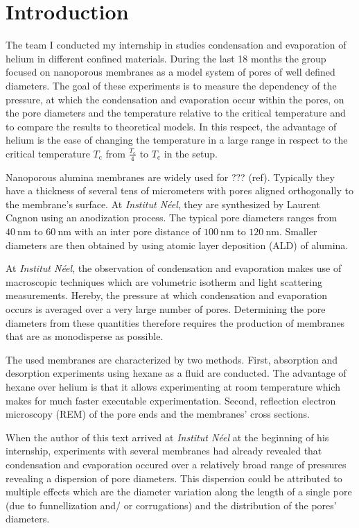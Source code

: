 \documentclass[../thesis.tex]{subfiles}
\begin{document}
  \chapter{Introduction}
  \label{ch:introduction}

    The team I conducted my internship in studies condensation and evaporation of helium in different confined materials. During the last 18 months the group focused on nanoporous membranes as a model system of pores of well defined diameters. The goal of these experiments is to measure the dependency of the pressure, at which the condensation and evaporation occur within the pores, on the pore diameters and the temperature relative to the critical temperature and to compare the results to theoretical models. In this respect, the advantage of helium is the ease of changing the temperature in a large range in respect to the critical temperature $T_\mathrm{c}$ from $\frac{T_\mathrm{c}}{4}$ to $T_\mathrm{c}$ in the setup.
    \medskip

    Nanoporous alumina membranes are widely used for ??? (ref). Typically they have a thickness of several tens of micrometers with pores aligned orthogonally to the membrane's surface. At \textit{Institut Néel}, they are synthesized by Laurent Cagnon using an anodization process. The typical pore diameters ranges from $\SI{40}{\nano\meter}$ to $\SI{60}{\nano\meter}$ with an inter pore distance of $\SI{100}{\nano\meter}$ to $\SI{120}{\nano\meter}$. Smaller diameters are then obtained by using atomic layer deposition (ALD) of alumina.
    \medskip

    At \textit{Institut Néel}, the observation of condensation and evaporation makes use of macroscopic techniques which are volumetric isotherm and light scattering measurements. Hereby, the pressure at which condensation and evaporation occurs is averaged over a very large number of pores. Determining the pore diameters from these quantities therefore requires the production of membranes that are as monodisperse as possible.
    \medskip

    The used membranes are characterized by two methods. First, absorption and desorption experiments using hexane as a fluid are conducted. The advantage of hexane over helium is that it allows experimenting at room temperature which makes for much faster executable experimentation. Second, reflection electron microscopy (REM) of the pore ends and the membranes' cross sections.
    \medskip

    When the author of this text arrived at \textit{Institut Néel} at the beginning of his internship, experiments with several membranes had already revealed that condensation and evaporation occured over a relatively broad range of pressures revealing a dispersion of pore diameters. This dispersion could be attributed to multiple effects which are the diameter variation along the length of a single pore (due to funnellization and/ or corrugations) and the distribution of the pores' diameters.
    \medskip
\end{document}
